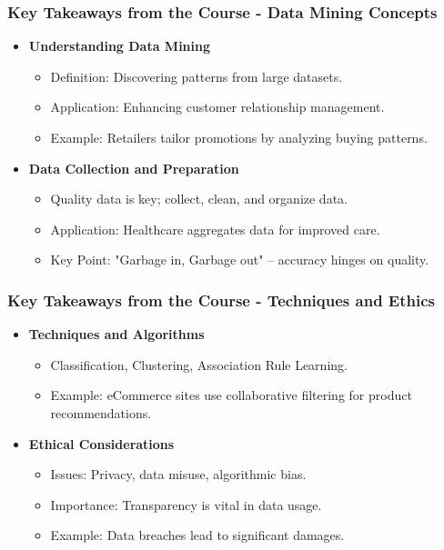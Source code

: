 \documentclass[aspectratio=169]{beamer}
\begin{document}
\begin{frame}[fragile]
    \frametitle{Key Takeaways from the Course - Data Mining Concepts}
    \begin{itemize}
        \item \textbf{Understanding Data Mining}
        \begin{itemize}
            \item Definition: Discovering patterns from large datasets.
            \item Application: Enhancing customer relationship management.
            \item Example: Retailers tailor promotions by analyzing buying patterns.
        \end{itemize}
        
        \item \textbf{Data Collection and Preparation}
        \begin{itemize}
            \item Quality data is key; collect, clean, and organize data.
            \item Application: Healthcare aggregates data for improved care.
            \item Key Point: "Garbage in, Garbage out" – accuracy hinges on quality.
        \end{itemize}
    \end{itemize}
\end{frame}

\begin{frame}[fragile]
    \frametitle{Key Takeaways from the Course - Techniques and Ethics}
    \begin{itemize}
        \item \textbf{Techniques and Algorithms}
        \begin{itemize}
            \item Classification, Clustering, Association Rule Learning.
            \item Example: eCommerce sites use collaborative filtering for product recommendations.
        \end{itemize}

        \item \textbf{Ethical Considerations}
        \begin{itemize}
            \item Issues: Privacy, data misuse, algorithmic bias.
            \item Importance: Transparency is vital in data usage.
            \item Example: Data breaches lead to significant damages.
        \end{itemize}
    \end{itemize}
\end{frame}
\end{document}
